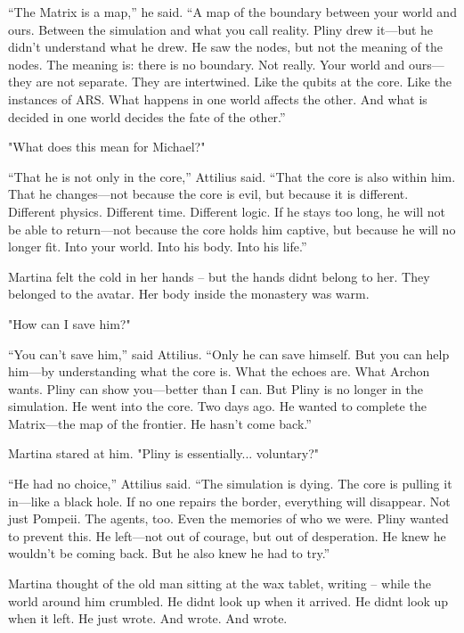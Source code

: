 \documentclass[
]{article}
\begin{document}
``The Matrix is \hspace{0pt}\hspace{0pt}a map,'' he said. ``A map of the boundary between your world and ours. Between the simulation and what you call reality. Pliny drew it---but he didn't understand what he drew. He saw the nodes, but not the meaning of the nodes. The meaning is: there is no boundary. Not really. Your world and ours---they are not separate. They are intertwined. Like the qubits at the core. Like the instances of ARS. What happens in one world affects the other. And what is decided in one world decides the fate of the other.''

"What does this mean for Michael?"

``That he is not only in the core,'' Attilius said. ``That the core is also within him. That he changes---not because the core is evil, but because it is different. Different physics. Different time. Different logic. If he stays too long, he will not be able to return---not because the core holds him captive, but because he will no longer fit. Into your world. Into his body. Into his life.''

Martina felt the cold in her hands -- but the hands didn\textquotesingle t belong to her. They belonged to the avatar. Her body inside the monastery was warm.

"How can I save him?"

``You can't save him,'' said Attilius. ``Only he can save himself. But you can help him---by understanding what the core is. What the echoes are. What Archon wants. Pliny can show you---better than I can. But Pliny is no longer in the simulation. He went into the core. Two days ago. He wanted to complete the Matrix---the map of the frontier. He hasn't come back.''

Martina stared at him. "Pliny is essentially... voluntary?"

``He had no choice,'' Attilius said. ``The simulation is dying. The core is pulling it in---like a black hole. If no one repairs the border, everything will disappear. Not just Pompeii. The agents, too. Even the memories of who we were. Pliny wanted to prevent this. He left---not out of courage, but out of desperation. He knew he wouldn't be coming back. But he also knew he had to try.''

Martina thought of the old man sitting at the wax tablet, writing -- while the world around him crumbled. He didn\textquotesingle t look up when it arrived. He didn\textquotesingle t look up when it left. He just wrote. And wrote. And wrote.
\end{document}
